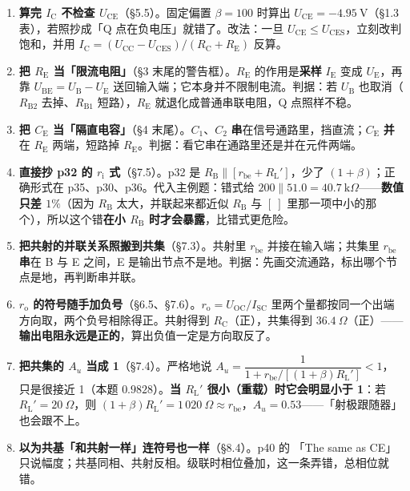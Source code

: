 \documentclass[11pt]{ctexart}
\newcommand{\UCC}{U_{\mathrm{CC}}}
\newcommand{\UBE}{U_{\mathrm{BE}}}
\newcommand{\UCE}{U_{\mathrm{CE}}}
\newcommand{\UB}{U_{\mathrm{B}}}
\newcommand{\UE}{U_{\mathrm{E}}}
\newcommand{\IC}{I_{\mathrm{C}}}
\newcommand{\IE}{I_{\mathrm{E}}}
\newcommand{\RB}{R_{\mathrm{B}}}
\newcommand{\RBone}{R_{\mathrm{B1}}}
\newcommand{\RBtwo}{R_{\mathrm{B2}}}
\newcommand{\RC}{R_{\mathrm{C}}}
\newcommand{\RE}{R_{\mathrm{E}}}
\newcommand{\RLp}{R_{\mathrm{L}}'}
\newcommand{\CEcap}{C_{\mathrm{E}}}
\newcommand{\rbe}{r_{\mathrm{be}}}
\newcommand{\Au}{A_{u}}
\newcommand{\ri}{r_{\mathrm{i}}}
\newcommand{\ro}{r_{\mathrm{o}}}
\newcommand{\ISC}{I_{\mathrm{SC}}}
\begin{document}

\begin{enumerate}
\item \textbf{算完 $\IC$ 不检查 $\UCE$}（§5.5）。固定偏置 $\beta=100$ 时算出 $\UCE=-4.95\ \mathrm{V}$（§1.3 表），若照抄成「Q 点在负电压」就错了。改法：一旦 $\UCE\le U_{\mathrm{CES}}$，立刻改判饱和，并用 $\IC=(\UCC-U_{\mathrm{CES}})/(\RC+\RE)$ 反算。

\item \textbf{把 $\RE$ 当「限流电阻」}（§3 末尾的警告框）。$\RE$ 的作用是\textbf{采样} $\IE$ 变成 $\UE$，再靠 $\UBE=\UB-\UE$ 送回输入端；它本身并不限制电流。判据：若 $\UB$ 也取消（$\RBtwo$ 去掉、$\RBone$ 短路），$\RE$ 就退化成普通串联电阻，Q 点照样不稳。

\item \textbf{把 $\CEcap$ 当「隔直电容」}（§4 末尾）。$C_1$、$C_2$ \textbf{串}在信号通路里，挡直流；$\CEcap$ \textbf{并}在 $\RE$ 两端，短路掉 $\RE$。判据：看它串在通路里还是并在元件两端。

\item \textbf{直接抄 p32 的 $\ri$ 式}（§7.5）。p32 是 $\RB\parallel[\rbe+\RLp]$，少了 $(1+\beta)$；正确形式在 p35、p30、p36。代入主例题：错式给 $200\parallel51.0=40.7\ \mathrm{k}\Omega$——\textbf{数值只差 $1\%$}（因为 $\RB$ 太大，并联起来都近似 $\RB$ 与 $[\ ]$ 里那一项中小的那个），所以这个错\textbf{在小 $\RB$ 时才会暴露}，比错式更危险。

\item \textbf{把共射的并联关系照搬到共集}（§7.3）。共射里 $\rbe$ 并接在输入端；共集里 $\rbe$ \textbf{串}在 B 与 E 之间，E 是输出节点不是地。判据：先画交流通路，标出哪个节点是地，再判断串并联。

\item \textbf{$\ro$ 的符号随手加负号}（§6.5、§7.6）。$\ro=U_{\mathrm{OC}}/\ISC$ 里两个量都按同一个出端方向取，两个负号相除得正。共射得到 $\RC$（正），共集得到 $36.4\ \Omega$（正）——\textbf{输出电阻永远是正的}，算出负值一定是方向取反了。

\item \textbf{把共集的 $A_u$ 当成 1}（§7.4）。严格地说 $\Au=\dfrac{1}{1+\rbe/[(1+\beta)\RLp]}<1$，只是很接近 1（本题 $0.9828$）。\textbf{当 $\RLp$ 很小（重载）时它会明显小于 1}：若 $\RLp=20\ \Omega$，则 $(1+\beta)\RLp=1\,020\ \Omega\approx\rbe$，$\Au=0.53$——「射极跟随器」也会跟不上。

\item \textbf{以为共基「和共射一样」连符号也一样}（§8.4）。p40 的 「The same as CE」 只说幅度；共基同相、共射反相。级联时相位叠加，这一条弄错，总相位就错。
\end{enumerate}
\end{document}
